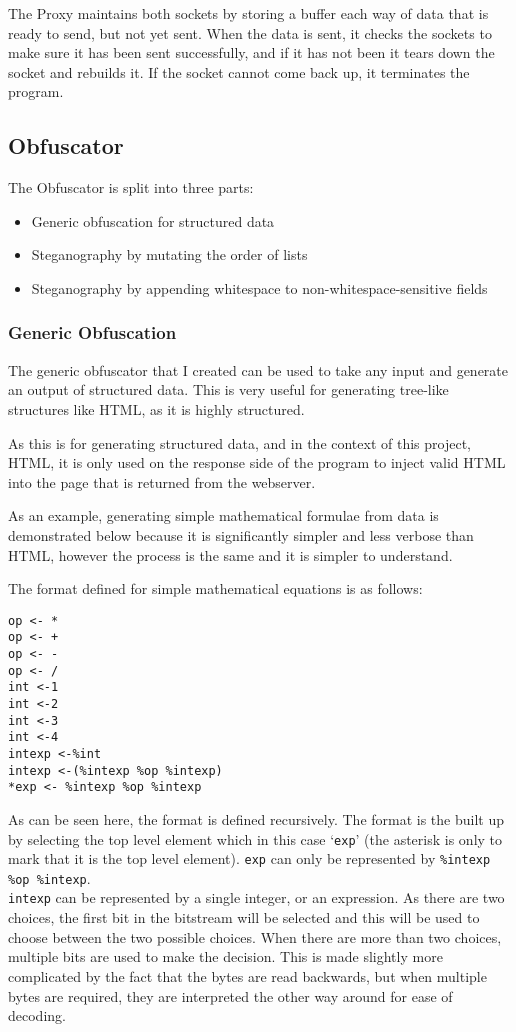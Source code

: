 The Proxy maintains both sockets by storing a buffer each way of data that is ready to send, but not yet sent. When the data is sent, it checks the sockets to make sure it has been sent successfully, and if it has not been it tears down the socket and rebuilds it. If the socket cannot come back up, it terminates the program.
\subsection{Obfuscator}
The Obfuscator is split into three parts:
\begin{itemize}
    \item Generic obfuscation for structured data
    \item Steganography by mutating the order of lists
    \item Steganography by appending whitespace to non-whitespace-sensitive fields
\end{itemize}

\subsubsection{Generic Obfuscation}
The generic obfuscator that I created can be used to take any input and generate an output of structured data. This is very useful for generating tree-like structures like HTML, as it is highly structured.\par
As this is for generating structured data, and in the context of this project, HTML, it is only used on the response side of the program to inject valid HTML into the page that is returned from the webserver.\par
As an example, generating simple mathematical formulae from data is demonstrated below because it is significantly simpler and less verbose than HTML, however the process is the same and it is simpler to understand.\par
The format defined for simple mathematical equations is as follows:
\begin{lstlisting}[language=pagefile]
op <- *
op <- +
op <- -
op <- /
int <-1
int <-2
int <-3
int <-4
intexp <-%int
intexp <-(%intexp %op %intexp)
*exp <- %intexp %op %intexp
\end{lstlisting}

As can be seen here, the format is defined recursively.
The format is the built up by selecting the top level element which in this case `\texttt{exp}' (the asterisk is only to mark that it is the top level element).
\texttt{exp} can only be represented by \texttt{\%intexp \%op \%intexp}. \\
\texttt{intexp} can be represented by a single integer, or an expression.
As there are two choices, the first bit in the bitstream will be selected and this will be used to choose between the two possible choices.
When there are more than two choices, multiple bits are used to make the decision.
This is made slightly more complicated by the fact that the bytes are read backwards, but when multiple bytes are required, they are interpreted the other way around for ease of decoding.

